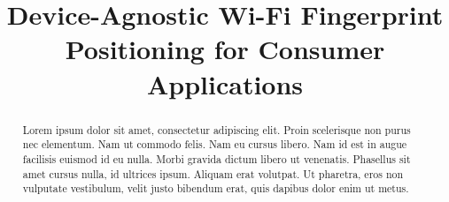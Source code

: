 \documentclass[conference]{IEEEtran}
\begin{document}
\title{Device-Agnostic Wi-Fi Fingerprint Positioning for Consumer Applications}


\author{
\and
{}
\and
{}
\and
{}
}


\maketitle

\begin{abstract}
Lorem ipsum dolor sit amet, consectetur adipiscing elit. Proin scelerisque non purus nec elementum. Nam ut commodo felis. Nam eu cursus libero. Nam id est in augue facilisis euismod id eu nulla. Morbi gravida dictum libero ut venenatis. Phasellus sit amet cursus nulla, id ultrices ipsum. Aliquam erat volutpat. Ut pharetra, eros non vulputate vestibulum, velit justo bibendum erat, quis dapibus dolor enim ut metus.
\end{abstract}

\IEEEpeerreviewmaketitle
\end{document}

